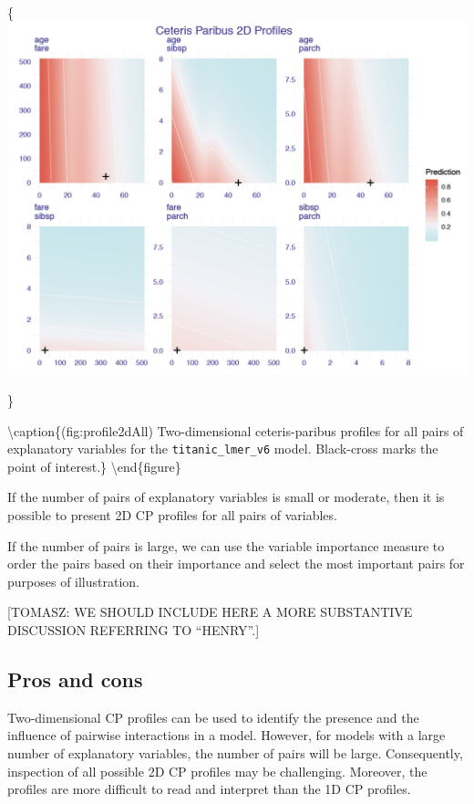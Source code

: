 \documentclass[12pt,]{krantz}
\begin{document}
\{\centering \includegraphics[width=0.9\linewidth]{figure/profile_2d_all}

\}

\textbackslash{}caption\{(fig:profile2dAll) Two-dimensional ceteris-paribus profiles for all pairs of explanatory variables for the \texttt{titanic\_lmer\_v6} model. Black-cross marks the point of interest.\}\label{fig:profile2dAll}
\textbackslash{}end\{figure\}

If the number of pairs of explanatory variables is small or moderate, then it is possible to present 2D CP profiles for all pairs of variables.

If the number of pairs is large, we can use the variable importance measure to order the pairs based on their importance and select the most important pairs for purposes of illustration.

{[}TOMASZ: WE SHOULD INCLUDE HERE A MORE SUBSTANTIVE DISCUSSION REFERRING TO ``HENRY''.{]}

\hypertarget{ceterisParibus2dProsCons}{%
\subsection{Pros and cons}\label{ceterisParibus2dProsCons}}

Two-dimensional CP profiles can be used to identify the presence and the influence of pairwise interactions in a model. However, for models with a large number of explanatory variables, the number of pairs will be large. Consequently, inspection of all possible 2D CP profiles may be challenging. Moreover, the profiles are more difficult to read and interpret than the 1D CP profiles.
\end{document}
